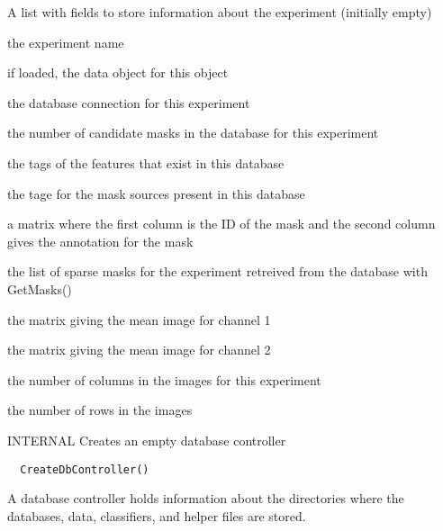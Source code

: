 \documentclass[a4paper]{book}
\begin{document}
%
\begin{Value}
A list with fields to store information about the
experiment (initially empty) \begin{ldescription}
\item[\code{name}] the experiment
name\item[\code{data}] if loaded, the data object for this
object\item[\code{db}] the database connection for this
experiment\item[\code{nmasks}] the number of candidate masks
in the database for this experiment\item[\code{features}] the
tags of the features that exist in this database
\item[\code{sources}] the tage for the mask sources present in
this database\item[\code{selmat}] a matrix where the first
column is the ID of the mask and the second column gives
the annotation for the mask\item[\code{sms}] the list of
sparse masks for the experiment retreived from the
database with GetMasks()\item[\code{mimg1}] the matrix giving
the mean image for channel 1\item[\code{mimg2}] the matrix
giving the mean image for channel 2\item[\code{nx}] the number
of columns in the images for this experiment
\item[\code{ny}] the number of rows in the images
\end{ldescription}
\end{Value}
%
\begin{Description}\relax
INTERNAL Creates an empty database controller
\end{Description}
%
\begin{Usage}
\begin{verbatim}
  CreateDbController()
\end{verbatim}
\end{Usage}
%
\begin{Details}\relax
A database controller holds information about the
directories where the databases, data, classifiers, and
helper files are stored. \\{}
\end{Details}
%
\end{document}
